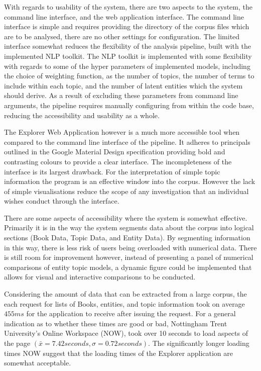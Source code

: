 \documentclass[10pt]{report}
\begin{document}
With regards to usability of the system, there are two aspects to the system, the command line interface, and the web application interface. The command line interface is simple and requires providing the directory of the corpus files which are to be analysed, there are no other settings for configuration. The limited interface somewhat reduces the flexibility of the analysis pipeline, built with the implemented NLP toolkit. The NLP toolkit is implemented with some flexibility with regards to some of the hyper parameters of implemented models, including the choice of weighting function, as the number of topics, the number of terms to include within each topic, and the number of latent entities which the system should derive. As a result of excluding these parameters from command line arguments, the pipeline requires manually configuring from within the code base, reducing the accessibility and usability as a whole. 

The Explorer Web Application however is a much more accessible tool when compared to the command line interface of the pipeline. It adheres to principals outlined in the Google Material Design specification providing bold and contrasting colours to provide a clear interface. The incompleteness of the interface is its largest drawback. For the interpretation of simple topic information the program is an effective window into the corpus. However the lack of simple visualisations reduce the scope of any investigation that an individual wishes conduct through the interface.

There are some aspects of accessibility where the system is somewhat effective. Primarily it is in the way the system segments data about the corpus into logical sections (Book Data, Topic Data, and Entity Data). By segmenting information in this way, there is less risk of users being overloaded with numerical data. There is still room for improvement however, instead of presenting a panel of numerical comparisons of entity topic models, a dynamic figure could be implemented that allows for visual and interactive comparisons to be conducted.

Considering the amount of data that can be extracted from a large corpus, the each request for lists of Books, entities, and topic information took on average $455ms$ for the application to receive after issuing the request. For a general indication as to whether these times are good or bad, Nottingham Trent University's Online Workspace (NOW), took over 10 seconds to load aspects of the page $(\bar{x}= 7.42 seconds, \sigma=0.72 seconds)$. The significantly longer loading times NOW suggest that the loading times of the Explorer application are somewhat acceptable.
\end{document}
